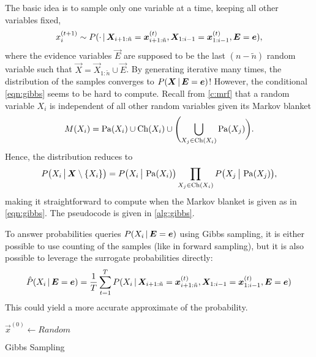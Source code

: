			The basic idea is to sample only one variable at a time, keeping all other variables fixed,
			\begin{equation}
				x_i^{(t + 1)} \sim P(\cdot \,\vert\, \bm{X}_{i + 1:\tilde{n}} = \bm{x}_{i + 1:\tilde{n}}^{(t)}, \bm{X}_{1:i - 1} = \bm{x}_{1:i - 1}^{(t)}, \bm{E} = \bm{e}),  \label{eqn:gibbs}
			\end{equation}
			where the evidence variables \(\vec{E}\) are supposed to be the last \( (n - \tilde{n}) \) random variable such that \( \vec{X} = \vec{X}_{1:\tilde{n}} \cup \vec{E} \). By generating iterative many times, the distribution of the samples converges to \( P(\bm{X} \,\vert\, \bm{E} = \bm{e}) \)! However, the conditional \eqref{eqn:gibbs} seems to be hard to compute. Recall from \autoref{c:mrf} that a random variable \(X_i\) is independent of all other random variables given its Markov blanket
			\begin{equation}
				M(X_i) = \operatorname{Pa}(X_i) \cup \operatorname{Ch}(X_i) \cup \Biggl( \bigcup_{X_j \in \operatorname{Ch}(X_i)} \operatorname{Pa}(X_j) \biggr).
			\end{equation}
			Hence, the distribution reduces to
			\begin{equation}
				P\bigl( X_i \,\big\vert\, \bm{X} \setminus \{ X_i \} \bigr) = P\bigl( X_i \,\big\vert\, \operatorname{Pa}(X_i) \bigr) \prod_{X_j \in \operatorname{Ch}(X_i)} P\bigl( X_j \,\big\vert\, \operatorname{Pa}(X_j) \bigr),
			\end{equation}
			making it straightforward to compute when the Markov blanket is given as in \eqref{eqn:gibbs}. The pseudocode is given in \autoref{alg:gibbs}.

			To answer probabilities queries \( P(X_i \,\vert\, \bm{E} = \bm{e}) \) using Gibbs sampling, it is either possible to use counting of the samples (like in forward sampling), but it is also possible to leverage the surrogate probabilities directly:
			\begin{equation}
				\hat{P}(X_i \,\vert\, \bm{E} = \bm{e}) = \frac{1}{T} \sum_{t = 1}^{T} P(X_i \,\vert\, \bm{X}_{i + 1:\tilde{n}} = \bm{x}_{i + 1:\tilde{n}}^{(t)}, \bm{X}_{1:i - 1} = \bm{x}_{1:i - 1}^{(t)}, \bm{E} = \bm{e})
			\end{equation}
			This could yield a more accurate approximate of the probability.

			\begin{algorithm}  \DontPrintSemicolon
				\( \vec{x}^{(0)} \gets \mathit{Random} \) \;
				\caption{Gibbs Sampling}
				\label{alg:gibbs}
			\end{algorithm}


